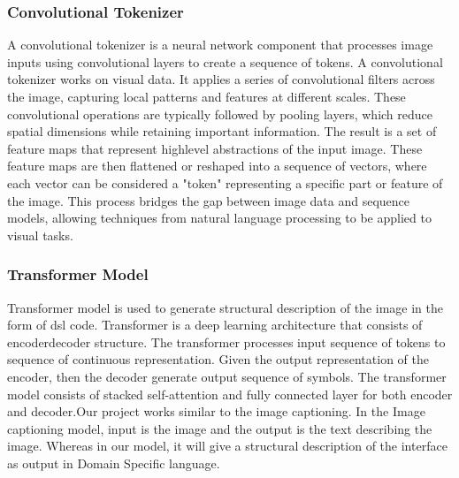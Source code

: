 \documentclass{ioereport}
\begin{document}
\subsubsection{Convolutional Tokenizer}
A convolutional tokenizer is a neural network component that processes image inputs
using convolutional layers to create a sequence of tokens. A convolutional tokenizer
works on visual data. It applies a series of convolutional filters across the image,
capturing local patterns and features at different scales. These convolutional operations
are typically followed by pooling layers, which reduce spatial dimensions while
retaining important information. The result is a set of feature maps that represent highlevel abstractions of the input image. These feature maps are then flattened or reshaped
into a sequence of vectors, where each vector can be considered a "token" representing
a specific part or feature of the image. This process bridges the gap between image data
and sequence models, allowing techniques from natural language processing to be
applied to visual tasks.
\subsubsection{Transformer Model}
Transformer model is used to generate structural description of the image in the form
of \gls{dsl} code. Transformer is a deep learning architecture that consists of encoderdecoder structure. The transformer processes input sequence of tokens to sequence of
continuous representation. Given the output representation of the encoder, then the
decoder generate output sequence of symbols. The transformer model consists of
stacked self-attention and fully connected layer for both encoder and decoder.Our project works similar to the image captioning. In the Image captioning model, input
is the image and the output is the text describing the image. Whereas in our model, it
will give a structural description of the interface as output in Domain Specific language.
\end{document}
